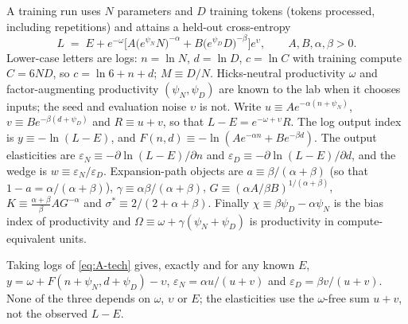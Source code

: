 \begin{definition}[Technology]\label{def:tech}
A training run uses $N$ parameters and $D$ training tokens (tokens processed, including repetitions) and attains a
held-out cross-entropy
\begin{equation}\label{eq:A-tech}
L \;=\; E + e^{-\omega}\Big[A\big(e^{\psi_N}N\big)^{-\alpha} + B\big(e^{\psi_D}D\big)^{-\beta}\Big]e^{\upsilon},
\qquad A,B,\alpha,\beta>0 .
\end{equation}
Lower-case letters are logs: $n=\ln N$, $d=\ln D$, $c=\ln C$ with training compute $C=6ND$, so $c=\ln 6+n+d$; $M\equiv D/N$.
Hicks-neutral productivity $\omega$ and factor-augmenting productivity $(\psi_N,\psi_D)$ are known to the lab when it
chooses inputs; the seed and evaluation noise $\upsilon$ is not. Write $u\equiv Ae^{-\alpha(n+\psi_N)}$, $v\equiv Be^{-\beta(d+\psi_D)}$ and
$R\equiv u+v$, so that $L-E=e^{-\omega+\upsilon}R$. The log output index is $y\equiv-\ln(L-E)$, and
$F(n,d)\equiv-\ln(Ae^{-\alpha n}+Be^{-\beta d})$. The output elasticities are
$\varepsilon_N\equiv-\partial\ln(L-E)/\partial n$ and $\varepsilon_D\equiv-\partial\ln(L-E)/\partial d$, and the wedge is
$w\equiv\varepsilon_N/\varepsilon_D$. Expansion-path objects are $a\equiv\beta/(\alpha+\beta)$ (so that
$1-a=\alpha/(\alpha+\beta)$), $\gamma\equiv\alpha\beta/(\alpha+\beta)$, $G\equiv(\alpha A/\beta B)^{1/(\alpha+\beta)}$,
$K\equiv\frac{\alpha+\beta}{\beta}AG^{-\alpha}$ and $\sigma^*\equiv2/(2+\alpha+\beta)$. Finally
$\chi\equiv\beta\psi_D-\alpha\psi_N$ is the bias index of productivity and $\Omega\equiv\omega+\gamma(\psi_N+\psi_D)$ is
productivity in compute-equivalent units.
\end{definition}

\begin{remark}\label{rem:exact}
Taking logs of \eqref{eq:A-tech} gives, exactly and for any known $E$, $y=\omega+F(n+\psi_N,d+\psi_D)-\upsilon$,
$\varepsilon_N=\alpha u/(u+v)$ and $\varepsilon_D=\beta v/(u+v)$. None of the three depends on $\omega$, $\upsilon$ or
$E$; the elasticities use the $\omega$-free sum $u+v$, not the observed $L-E$.
\end{remark}

